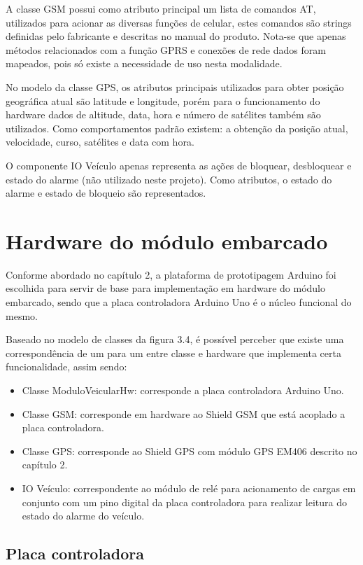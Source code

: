 A classe GSM possui como atributo principal um lista de comandos AT, utilizados para acionar as diversas funções de celular, estes comandos são strings definidas pelo fabricante e descritas no manual do produto. Nota-se que apenas métodos relacionados com a função GPRS e conexões de rede dados foram mapeados, pois só existe a necessidade de uso nesta modalidade.

No modelo da classe GPS, os atributos principais utilizados para obter posição geográfica atual são latitude e longitude, porém para o funcionamento do hardware
dados de altitude, data, hora e número de satélites também são utilizados. Como comportamentos padrão existem: a obtenção da posição atual, velocidade, curso, satélites e data com hora.

O componente IO Veículo apenas representa as ações de bloquear, desbloquear e estado do alarme (não utilizado neste projeto). Como atributos, o estado do alarme e estado de bloqueio são representados.

\section{Hardware do módulo embarcado}

Conforme abordado no capítulo 2, a plataforma de prototipagem Arduino foi escolhida para servir de base para implementação em hardware do módulo embarcado, sendo que a placa controladora Arduino Uno é o núcleo funcional do mesmo. 

Baseado no modelo de classes da figura 3.4, é possível perceber que existe uma correspondência de um para um entre classe e hardware que implementa certa funcionalidade, assim sendo:

\begin{itemize}
	\item Classe ModuloVeicularHw: corresponde a placa controladora Arduino Uno.
	\item Classe GSM: corresponde em hardware ao Shield GSM que está acoplado a placa controladora.
	\item Classe GPS: corresponde ao Shield GPS com módulo GPS EM406 descrito no capítulo 2.
	\item IO Veículo: correspondente ao módulo de relé para acionamento de cargas em conjunto com um pino digital da placa controladora para realizar leitura do estado do alarme do veículo.
\end{itemize}

\subsection{Placa controladora}

